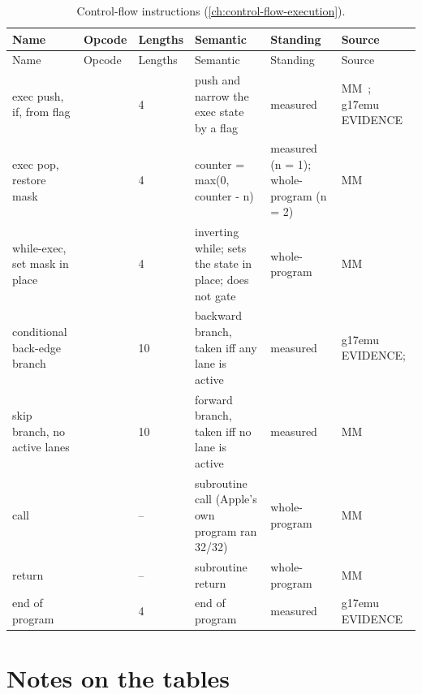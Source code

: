 \widetable
\begin{xltabular}{\linewidth}{@{}>{\hsize}Xll>{\hsize}X>{\hsize}X>{\hsize}X@{}}
\caption{Control-flow instructions (\cref{ch:control-flow-execution}).}\label{tab:scalar-control-flow}\\
\toprule
Name & Opcode & Lengths & Semantic & Standing & Source \\
\midrule
\endfirsthead
{}
\toprule
Name & Opcode & Lengths & Semantic & Standing & Source \\
\midrule
\endhead
exec push, if, from flag &  & 4 & push and narrow the exec state by a flag & measured & MM~; g17emu EVIDENCE \\*
exec pop, restore mask &  & 4 & counter = max(0, counter - n) & measured (n = 1); whole-program (n = 2) & MM~ \\*
while-exec, set mask in place &  & 4 & inverting while; sets the state in place; does not gate  & whole-program & MM~ \\*
conditional back-edge branch &  & 10 & backward branch, taken iff any lane is active & measured & g17emu EVIDENCE;  \\*
skip branch, no active lanes &  & 10 & forward branch, taken iff no lane is active & measured & MM~ \\*
call &  & – & subroutine call (Apple's own program ran 32/32) & whole-program & MM~ \\*
return &  & – & subroutine return & whole-program & MM~ \\*
end of program &  & 4 & end of program & measured & g17emu EVIDENCE \\*
\bottomrule
\end{xltabular}

\section{Notes on the tables}\label{sec:notes-table}

